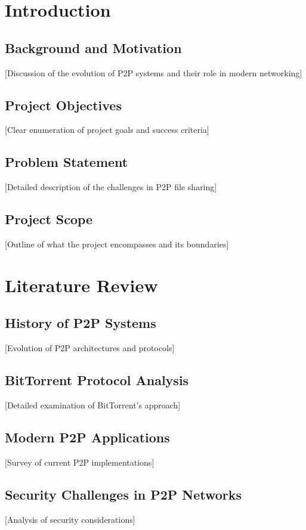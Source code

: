 \tableofcontents
\listoffigures
\listoftables

\chapter{Introduction}
\section{Background and Motivation}
 [Discussion of the evolution of P2P systems and their role in modern networking]

\section{Project Objectives}
 [Clear enumeration of project goals and success criteria]

\section{Problem Statement}
 [Detailed description of the challenges in P2P file sharing]

\section{Project Scope}
 [Outline of what the project encompasses and its boundaries]

\chapter{Literature Review}
\section{History of P2P Systems}
 [Evolution of P2P architectures and protocols]

\section{BitTorrent Protocol Analysis}
 [Detailed examination of BitTorrent's approach]

\section{Modern P2P Applications}
 [Survey of current P2P implementations]

\section{Security Challenges in P2P Networks}
 [Analysis of security considerations]

